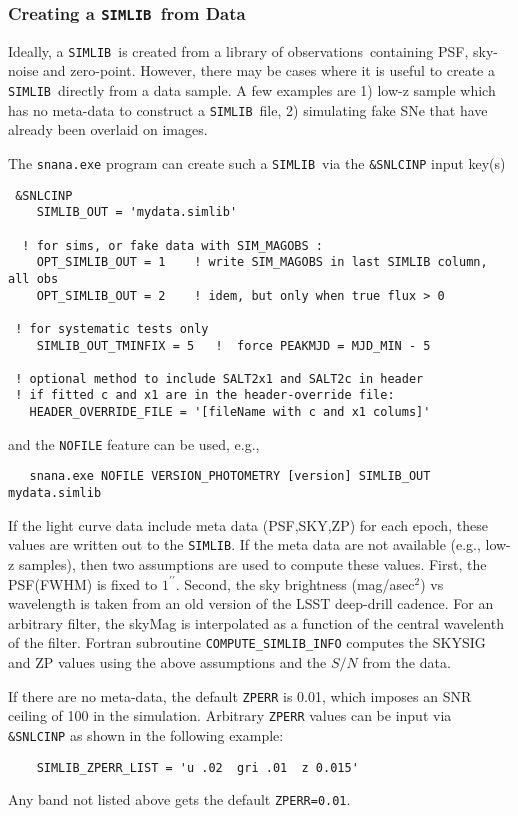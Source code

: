 \documentclass[12pt]{article}
\newcommand{\simlib}{{\tt SIMLIB}}
\newcommand{\obss}{observations}
\begin{document}
  \subsubsection{Creating a \simlib\ from Data}
  \label{sss:data_simlib}

Ideally, a \simlib\ is created from a library of
\obss\ containing PSF, sky-noise and zero-point.
However, there may be cases where it is useful to
create a \simlib\ directly from a data sample. 
A few examples are 
1) low-z sample which has no meta-data to construct a \simlib\ file, 
2) simulating fake SNe that have already been overlaid on images.

The {\tt snana.exe} program can create such a
\simlib\ via the {\tt \&SNLCINP} input key(s)
%
\begin{verbatim}
 &SNLCINP
    SIMLIB_OUT = 'mydata.simlib'

  ! for sims, or fake data with SIM_MAGOBS :
    OPT_SIMLIB_OUT = 1    ! write SIM_MAGOBS in last SIMLIB column, all obs
    OPT_SIMLIB_OUT = 2    ! idem, but only when true flux > 0

 ! for systematic tests only
    SIMLIB_OUT_TMINFIX = 5   !  force PEAKMJD = MJD_MIN - 5

 ! optional method to include SALT2x1 and SALT2c in header
 ! if fitted c and x1 are in the header-override file:
   HEADER_OVERRIDE_FILE = '[fileName with c and x1 colums]'
\end{verbatim}
%
and the {\tt NOFILE} feature can be used, e.g.,
\begin{verbatim}
   snana.exe NOFILE VERSION_PHOTOMETRY [version] SIMLIB_OUT mydata.simlib
\end{verbatim}


If the light curve data include meta data (PSF,SKY,ZP)
for each epoch, these values are written out to the \simlib.
If the meta data are not available (e.g., low-z samples),
then two assumptions are used to compute these values. 
First, the PSF(FWHM) is fixed to $1^{\prime\prime}$.
Second, the sky brightness (mag/asec$^2$) vs wavelength is 
taken from an old version of the LSST deep-drill cadence.
For an arbitrary filter, the skyMag is interpolated as a
function of the central wavelenth of the filter.
Fortran subroutine {\tt COMPUTE\_SIMLIB\_INFO}
computes the SKYSIG and ZP values using the above
assumptions and the $S/N$ from the data.


If there are no meta-data, the default {\tt ZPERR} is 0.01, 
which imposes an SNR ceiling of 100 in the simulation. 
Arbitrary {\tt ZPERR} values can be input via 
{\tt \&SNLCINP} as shown in the following example:
%
\begin{verbatim}
    SIMLIB_ZPERR_LIST = 'u .02  gri .01  z 0.015'
\end{verbatim}
%
Any band not listed above gets the default {\tt ZPERR=0.01}.
\end{document}

